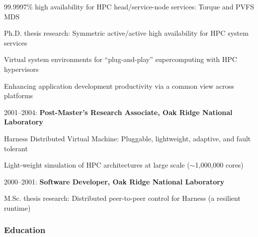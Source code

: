 \begin{compactitem}[0000--Present :]
\begin{compactitem}
                            \item 99.9997\% high availability for HPC
                                  head/service-node services: Torque and PVFS MDS
                            \item Ph.D. thesis research: Symmetric active/active
                                  high availability for HPC system services
                            \item Virtual system environments for
                                  ``plug-and-play'' supercomputing with HPC
                                  hypervisors
                            \item Enhancing application development productivity
                                  via a common view across platforms
                            \end{compactitem}
  \item[2001--2004\hfill :] \textbf{Post-Master's Research Associate,
                                    Oak Ridge National Laboratory }
                            \begin{compactitem}
                            \item Harness Distributed Virtual Machine: Pluggable, 
                                  lightweight, adaptive, and fault tolerant
                            \item Light-weight simulation of HPC architectures
                                  at large scale ($\sim$1,000,000 cores)
                            \end{compactitem}
  \item[2000--2001\hfill :] \textbf{Software Developer,
                                    Oak Ridge National Laboratory }
                            \begin{compactitem}
                            \item M.Sc. thesis research: Distributed peer-to-peer 
                                  control for Harness (a resilient runtime)
                            \end{compactitem}
\end{compactitem}

\vspace*{-2ex}
\subsubsection*{Education}
\vspace*{-1ex}

